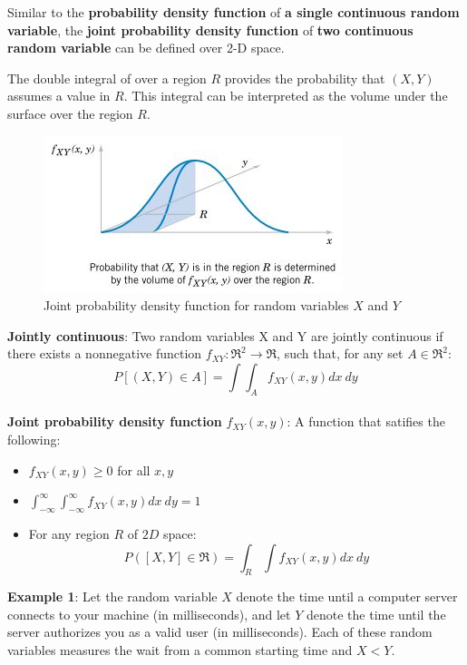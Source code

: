 \documentclass[10pt,a4paper]{article}
\begin{document}
Similar to the \textbf{probability density function} of \textbf{a single continuous random variable}, the
\textbf{joint probability density function} of \textbf{two continuous random variable} can be deﬁned over
2-D space. 

The double integral of over a region $R$ provides the probability that $(X,Y)$ assumes a
value in $R$. This integral can be interpreted as the volume under the surface over the region $R$. 

\begin{figure} [h!]
    \centering
    \includegraphics[scale=0.9]{Continu1.JPG}
    \caption{Joint probability density function for random variables $X$ and $Y$}
\end{figure}

\begin{tcolorbox}[breakable,colback=white]
    \textbf{Jointly continuous}: Two random variables X and Y are jointly continuous if there exists
    a nonnegative function $f_{XY}:\Re^2\rightarrow \Re$, such that, for any set $A\in \Re^2$:
    $$
    P\left[(X,Y)\in A\right] = \int \int_A f_{XY}(x,y)dx\: dy
    $$
    \\
    \textbf{Joint probability density function} $f_{XY}(x,y)$: A function that satifies the
    following:
    \begin{itemize}
        \item $f_{XY}(x,y)\geq 0$ for all $x,y$
        \item $\int_{-\infty}^\infty \int_{-\infty}^\infty f_{XY}(x,y)dx\: dy = 1$
        \item For any region $R$ of $2D$ space:
        $$
        P([X,Y]\in \Re) = \int_R \int f_{XY}(x,y)dx \: dy 
        $$
    \end{itemize}
\end{tcolorbox}

\textbf{Example 1}: Let the random variable $X$ denote the time until a computer server connects to your machine
(in milliseconds), and let $Y$ denote the time until the server authorizes you as a valid user (in
milliseconds). Each of these random variables measures the wait from a common starting time
and $X<Y$. 
\end{document}
